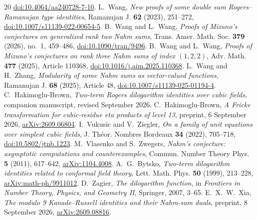 \documentclass[11pt,reqno]{amsart}
\theoremstyle{remark}
\numberwithin{equation}{section}
\begin{document}
\begin{thebibliography}{20}
\href{https://doi.org/10.4064/aa240728-7-10}{doi:10.4064/aa240728-7-10}.
L.~Wang, \emph{New proofs of some double sum Rogers--Ramanujan type
identities}, Ramanujan J. \textbf{62} (2023), 251--272,
\href{https://doi.org/10.1007/s11139-022-00654-5}{doi:10.1007/s11139-022-00654-5}.
B.~Wang and L.~Wang, \emph{Proofs of Mizuno's conjectures on generalized
rank two Nahm sums}, Trans. Amer. Math. Soc. \textbf{379} (2026), no.~1,
459--486, \href{https://doi.org/10.1090/tran/9496}{doi:10.1090/tran/9496}.
B.~Wang and L.~Wang, \emph{Proofs of Mizuno's conjectures on rank three
Nahm sums of index $(1,2,2)$}, Adv. Math. \textbf{477} (2025), Article
110368, \href{https://doi.org/10.1016/j.aim.2025.110368}{doi:10.1016/j.aim.2025.110368}.
L.~Wang and H.~Zhang, \emph{Modularity of some Nahm sums as vector-valued
functions}, Ramanujan J. \textbf{68} (2025), Article 48,
\href{https://doi.org/10.1007/s11139-025-01194-4}{doi:10.1007/s11139-025-01194-4}.
C.~Hakimoglu-Brown, \emph{Two-term Rogers dilogarithm identities over
cubic fields}, companion manuscript, revised September 2026.
C.~Hakimoglu-Brown, \emph{A Fricke transformation for cubic-residue eta
products of level 13}, preprint, 6 September 2026,
\href{https://arxiv.org/abs/2609.06804}{arXiv:2609.06804}.
I.~Vukusic and V.~Ziegler, \emph{On a family of unit equations over
simplest cubic fields}, J. Th\'eor. Nombres Bordeaux \textbf{34} (2022),
705--718, \href{https://doi.org/10.5802/jtnb.1223}{doi:10.5802/jtnb.1223}.
M.~Vlasenko and S.~Zwegers, \emph{Nahm's conjecture: asymptotic
computations and counterexamples}, Commun. Number Theory Phys.
\textbf{5} (2011), 617--642,
\href{https://arxiv.org/abs/1104.4008}{arXiv:1104.4008}.
A.~G.~Bytsko, \emph{Two-term dilogarithm identities related to conformal
field theory}, Lett. Math. Phys. \textbf{50} (1999), 213--228,
\href{https://arxiv.org/abs/math-ph/9911012}{arXiv:math-ph/9911012}.
D.~Zagier, \emph{The dilogarithm function}, in \emph{Frontiers in Number
Theory, Physics, and Geometry II}, Springer, 2007, 3--65.
E.~X.~W.~Xia, \emph{The modulo 9 Kanade--Russell identities and their
Nahm-sum duals}, preprint, 8 September 2026,
\href{https://arxiv.org/abs/2609.08816}{arXiv:2609.08816}.

\end{thebibliography}
\end{document}
